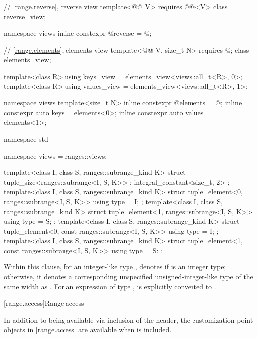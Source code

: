 \begin{codeblock}
{  // \ref{range.reverse}, reverse view
  template<@@ V>
    requires @@<V>
  class reverse_view;

  namespace views { inline constexpr @\unspec@ reverse = @\unspec@; }

  // \ref{range.elements}, elements view
  template<@@ V, size_t N>
    requires @\seebelow@;
  class elements_view;

  template<class R>
    using keys_view = elements_view<views::all_t<R>, 0>;
  template<class R>
    using values_view = elements_view<views::all_t<R>, 1>;

  namespace views {
    template<size_t N>
      inline constexpr @\unspec@ elements = @\unspec@ ;
    inline constexpr auto keys = elements<0>;
    inline constexpr auto values = elements<1>;
  }
}

namespace std {
  namespace views = ranges::views;

  template<class I, class S, ranges::subrange_kind K>
  struct tuple_size<ranges::subrange<I, S, K>>
    : integral_constant<size_t, 2> {};
  template<class I, class S, ranges::subrange_kind K>
  struct tuple_element<0, ranges::subrange<I, S, K>> {
    using type = I;
  };
  template<class I, class S, ranges::subrange_kind K>
  struct tuple_element<1, ranges::subrange<I, S, K>> {
    using type = S;
  };
  template<class I, class S, ranges::subrange_kind K>
  struct tuple_element<0, const ranges::subrange<I, S, K>> {
    using type = I;
  };
  template<class I, class S, ranges::subrange_kind K>
  struct tuple_element<1, const ranges::subrange<I, S, K>> {
    using type = S;
  };
}
\end{codeblock}

\pnum
{}%
%
Within this clause,
for an integer-like type ,
 denotes
 if  is an integer type;
otherwise, it denotes a corresponding unspecified unsigned-integer-like type
of the same width as .
For an expression  of type ,
 is
 explicitly converted to
.

[range.access]{Range access}

\pnum
In addition to being available via inclusion of the 
header, the customization point objects in \ref{range.access} are
available when  is included.

